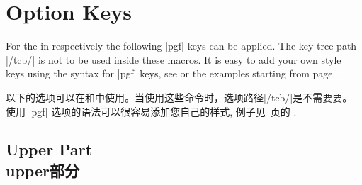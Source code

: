\section{Option Keys}\label{sec:optkeys}%
%
For the  in  respectively 
the following |pgf| keys can be applied. The key tree path |/tcb/| is not to
be used inside these macros. It is easy to add your own style keys using
the syntax for |pgf| keys, see \cite{tantau:tikz_and_pgf,sturm:latex} or the examples
starting from page~\pageref{sec:latextutorial}.

以下的选项可以在和中使用。当使用这些命令时，选项路径|/tcb/|是不需要要。
使用 |pgf| 选项的语法可以很容易添加您自己的样式, 例子见~\pageref{sec:latextutorial}页的 \cite{tantau:tikz_and_pgf,sturm:latex} .


% 
% 




\subsection{Upper Part\\upper部分}

  



